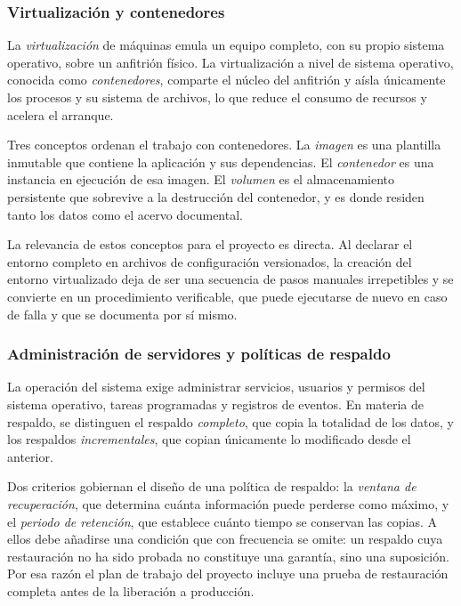 \subsubsection{Virtualización y contenedores}

La \emph{virtualización} de máquinas emula un equipo completo, con su propio sistema operativo, sobre un anfitrión físico. La virtualización a nivel de sistema operativo, conocida como \emph{contenedores}, comparte el núcleo del anfitrión y aísla únicamente los procesos y su sistema de archivos, lo que reduce el consumo de recursos y acelera el arranque.

Tres conceptos ordenan el trabajo con contenedores. La \emph{imagen} es una plantilla inmutable que contiene la aplicación y sus dependencias. El \emph{contenedor} es una instancia en ejecución de esa imagen. El \emph{volumen} es el almacenamiento persistente que sobrevive a la destrucción del contenedor, y es donde residen tanto los datos como el acervo documental.

La relevancia de estos conceptos para el proyecto es directa. Al declarar el entorno completo en archivos de configuración versionados, la creación del entorno virtualizado deja de ser una secuencia de pasos manuales irrepetibles y se convierte en un procedimiento verificable, que puede ejecutarse de nuevo en caso de falla y que se documenta por sí mismo.

\subsubsection{Administración de servidores y políticas de respaldo}

La operación del sistema exige administrar servicios, usuarios y permisos del sistema operativo, tareas programadas y registros de eventos. En materia de respaldo, se distinguen el respaldo \emph{completo}, que copia la totalidad de los datos, y los respaldos \emph{incrementales}, que copian únicamente lo modificado desde el anterior.

Dos criterios gobiernan el diseño de una política de respaldo: la \emph{ventana de recuperación}, que determina cuánta información puede perderse como máximo, y el \emph{periodo de retención}, que establece cuánto tiempo se conservan las copias. A ellos debe añadirse una condición que con frecuencia se omite: un respaldo cuya restauración no ha sido probada no constituye una garantía, sino una suposición. Por esa razón el plan de trabajo del proyecto incluye una prueba de restauración completa antes de la liberación a producción.

